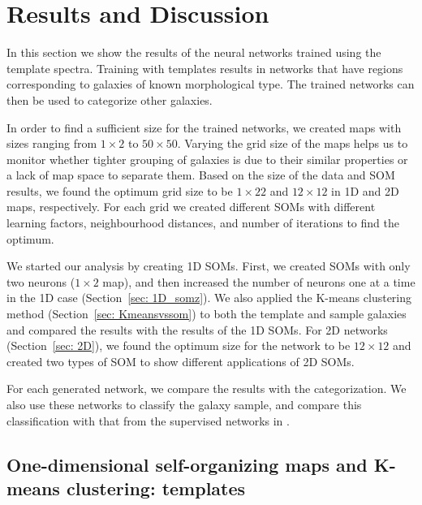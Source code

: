 \section{Results and Discussion}
\label{sec: result}


    In this section we show the results of the neural networks trained using the  template spectra.
    Training with  templates results in networks that have regions corresponding to galaxies of known morphological type. 
    The trained networks can then be used to categorize other galaxies.

    In order to find a sufficient size for the trained networks, we created maps with sizes ranging from $1\times2$ to $50\times50$.
    Varying the grid size of the maps helps us to monitor whether tighter grouping of galaxies is due to their similar properties or a lack of map space to separate them.
    Based on the size of the data and SOM results, we found the optimum grid size to be $1\times22$ and $12\times12$ in 1D and 2D maps, respectively. 
    For each grid we created different SOMs with different learning factors, neighbourhood distances, and number of iterations to find the optimum.
   
    We started our analysis by creating 1D SOMs. 
    First, we created SOMs with only two neurons ($1\times2$ map), and then increased the number of neurons one at a time in the 1D case (Section~\ref{sec: 1D_somz}).
    We also applied the K-means clustering method (Section~\ref{sec: Kmeansvssom}) to both the template and sample galaxies and compared the results with the results of the 1D SOMs.
    For 2D networks (Section~\ref{sec: 2D}), we found the optimum size for the network to be $12\times12$ and created two types of SOM to show different applications of 2D SOMs.
    
    For each generated network, we compare the results with the  categorization.
    We also use these networks to classify the  galaxy sample, and compare this classification with that from the supervised networks in .

\subsection{One-dimensional self-organizing maps and K-means clustering: templates}

